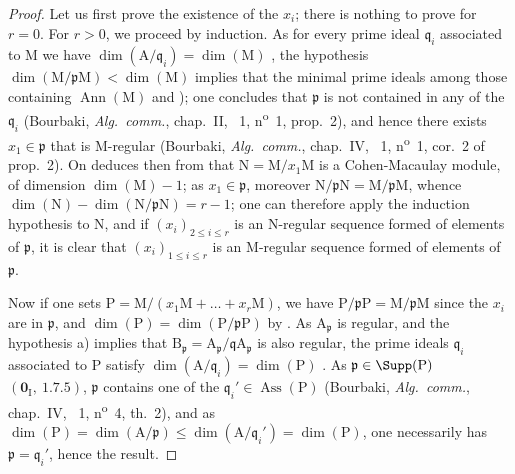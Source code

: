 \begin{proof}
Let us first prove the existence of the $x_i$; there is nothing to prove for $r=0$.
For $r>0$, we proceed by induction.
As for every prime ideal $\mathfrak{q}_i$ associated to $\mathrm{M}$ we have $\dim(\mathrm{A}/\mathfrak{q}_i)=\dim(\mathrm{M})$ , the hypothesis $\dim(\mathrm{M}/\mathfrak{p}\mathrm{M})<\dim(\mathrm{M})$ implies that the minimal prime ideals among those containing $\operatorname{Ann}(\mathrm{M})$  and ); one concludes that $\mathfrak{p}$ is not contained in any of the $\mathfrak{q}_i$ (Bourbaki, \emph{Alg.~comm.}, chap.~II, \textsection~1, n\textsuperscript{o}~1, prop.~2), and hence there exists $x_1\in\mathfrak{p}$ that is $\mathrm{M}$-regular (Bourbaki, \emph{Alg.~comm.}, chap.~IV, \textsection~1, n\textsuperscript{o}~1, cor.~2 of prop.~2).
On deduces then from  that $\mathrm{N}=\mathrm{M}/x_1\mathrm{M}$ is a Cohen-Macaulay module, of dimension $\dim(\mathrm{M})-1$; as $x_1\in\mathfrak{p}$, moreover $\mathrm{N}/\mathfrak{p}\mathrm{N}=\mathrm{M}/\mathfrak{p}\mathrm{M}$, whence $\dim(\mathrm{N})-\dim(\mathrm{N}/\mathfrak{p}\mathrm{N})=r-1$; one can therefore apply the induction hypothesis to $\mathrm{N}$, and if $(x_i)_{2\leq i\leq r}$ is an $\mathrm{N}$-regular sequence formed of elements of $\mathfrak{p}$, it is clear that $(x_i)_{1\leq i\leq r}$ is an $\mathrm{M}$-regular sequence formed of elements of $\mathfrak{p}$.

Now if one sets $\mathrm{P}=\mathrm{M}/(x_1\mathrm{M}+\ldots+x_r\mathrm{M})$, we have $\mathrm{P}/\mathfrak{p}\mathrm{P}=\mathrm{M}/\mathfrak{p}\mathrm{M}$ since the $x_i$ are in $\mathfrak{p}$, and $\dim(\mathrm{P})=\dim(\mathrm{P}/\mathfrak{p}\mathrm{P})$ by .
As $\mathrm{A}_\mathfrak{p}$ is regular, and the hypothesis a) implies that $\mathrm{B}_\mathfrak{p}=\mathrm{A}_\mathfrak{p}/\mathfrak{q}\mathrm{A}_\mathfrak{p}$ is also regular, the prime ideals $\mathfrak{q}_i$ associated to $\mathrm{P}$ satisfy $\dim(\mathrm{A}/\mathfrak{q}_i)=\dim(\mathrm{P})$ .
As $\mathfrak{p}\in\Supp(\mathrm{P})$ $(\mathbf{0}_\mathrm{I},~1.7.5)$, $\mathfrak{p}$ contains one of the $\mathfrak{q}_i'\in\operatorname{Ass}(\mathrm{P})$ (Bourbaki, \emph{Alg.~comm.}, chap.~IV, \textsection~1, n\textsuperscript{o}~4, th.~2), and as $\dim(\mathrm{P})=\dim(\mathrm{A}/\mathfrak{p})\leq\dim(\mathrm{A}/\mathfrak{q}_i')=\dim(\mathrm{P})$, one necessarily has $\mathfrak{p}=\mathfrak{q}_i'$, hence the result.
\end{proof}

